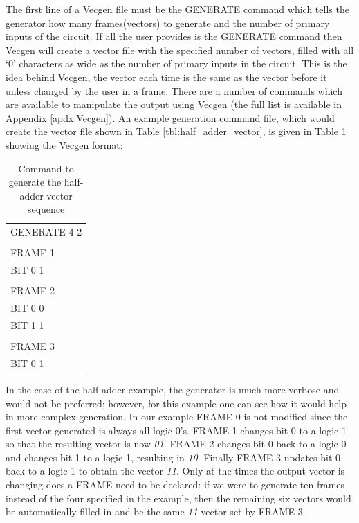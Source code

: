 \documentclass[12pt]{report}
\begin{document}
The first line of a Vecgen file must be the GENERATE command which tells the generator how many frames(vectors) to generate and the number of primary inputs of the circuit.  If all the user provides is the GENERATE command then Vecgen will create a vector file with the specified number of vectors, filled with all `0' characters as wide as the number of primary inputs in the circuit.  This is the idea behind Vecgen, the vector each time is the same as the vector before it unless changed by the user in a frame.  There are a number of commands which are available to manipulate the output using Vecgen (the full list is available in Appendix \ref{apdx:Vecgen}).  An example generation command file, which would create the vector file shown in Table \ref{tbl:half_adder_vector}, is given in Table \ref{tbl:Vecgen_example} showing the Vecgen format:
\begin{table}
	\begin{center}
		\begin{tabular}{l}
			GENERATE 4 2 \\		
			\\
			FRAME 1	\\
			BIT 0 1	\\
			\\
			FRAME 2	\\
			BIT 0 0	\\
			BIT 1 1	\\
			\\
			FRAME 3	\\
			BIT 0 1	\\
		\end{tabular}
	\end{center}
	\caption{Command to generate the half-adder vector sequence}
	\label{tbl:Vecgen_example}
\end{table}
In the case of the half-adder example, the generator is much more verbose and would not be preferred; however, for this example one can see how it would help in more complex generation.  In our example FRAME 0 is not modified since the first vector generated is always all logic 0's.  FRAME 1 changes bit 0 to a logic 1 so that the resulting vector is now \textit{01}.  FRAME 2 changes bit 0 back to a logic 0 and changes bit 1 to a logic 1, resulting in \textit{10}.  Finally FRAME 3 updates bit 0 back to a logic 1 to obtain the vector \textit{11}.  Only at the times the output vector is changing does a FRAME need to be declared: if we were to generate ten frames instead of the four specified in the example, then the remaining six vectors would be automatically filled in and be the same \textit{11} vector set by FRAME 3.
\end{document}
